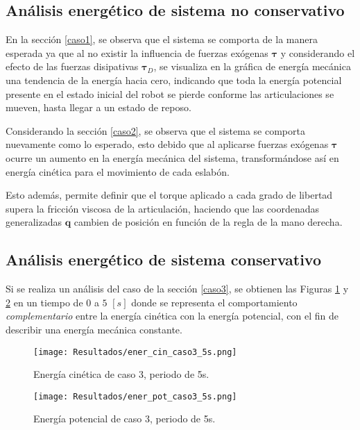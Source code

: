\subsection{Análisis energético de sistema no conservativo}
    En la sección \ref{caso1}, se observa que el sistema se comporta de la manera 
    esperada ya  que al no existir la influencia de fuerzas exógenas $\boldsymbol{\tau}$ y considerando el efecto de las fuerzas 
    disipativas $\boldsymbol{\tau}_D$, se visualiza en la gráfica de energía mecánica una tendencia de la energía hacia cero, 
    indicando que toda la energía potencial presente en el estado inicial del robot se pierde conforme las articulaciones se mueven, 
    hasta llegar a un estado de reposo. 
    
    Considerando la sección \ref{caso2}, se observa que el sistema se comporta nuevamente como lo esperado, esto debido que 
    al aplicarse fuerzas exógenas $\boldsymbol{\tau}$ ocurre un aumento en la energía mecánica del sistema, transformándose así en 
    energía cinética para el movimiento de cada eslabón. 

    Esto además, permite definir que el torque aplicado a cada grado de libertad supera la fricción viscosa de la articulación, 
    haciendo que las coordenadas generalizadas $\boldsymbol{q}$ cambien de posición en función de la regla de la mano
    derecha.  

\subsection{Análisis energético de sistema conservativo}
    Si se realiza un análisis del caso de la sección \ref{caso3}, 
    se obtienen las Figuras \ref{fig:ec3} y \ref{fig:ep3}
    en un tiempo de $0$ a $5$ $[s]$ donde se representa el comportamiento 
    \emph{complementario} entre la energía cinética con la energía 
    potencial, con el fin de describir una energía mecánica constante. 
    
    \begin{figure}[H]
        \centering
        \texttt{[image: Resultados/ener\_cin\_caso3\_5s.png]} 
        \caption{Energía cinética de caso 3, periodo de 5s.}
        \label{fig:ec3}
    \end{figure}

    \begin{figure}[H]
        \centering
        \texttt{[image: Resultados/ener\_pot\_caso3\_5s.png]} 
        \caption{Energía potencial de caso 3, periodo de 5s.}
        \label{fig:ep3}
    \end{figure}

